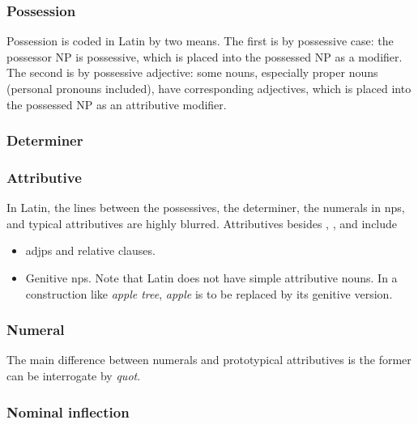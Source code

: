 \documentclass{article}
\newcommand*{\corpus}[1]{\emph{#1}}
\begin{document}
\subsubsection{Possession}\label{sec:possessive-abs}

Possession is coded in Latin by two means.
The first is by possessive case: 
the possessor NP is possessive, which is placed into the possessed NP as a modifier.
The second is by possessive adjective:
some nouns, especially proper nouns (personal pronouns included), have corresponding adjectives,
which is placed into the possessed NP as an attributive modifier.

\subsubsection{Determiner}\label{sec:determiner-abs}


\subsubsection{Attributive}

In Latin, the lines between the possessives, 
the determiner, the numerals in \ac{np}s, 
and typical attributives 
are highly blurred.
Attributives besides 
, 
, 
and  include 
\begin{itemize}
    \item \ac{adjp}s and relative clauses. %
    \item Genitive \ac{np}s. Note that Latin does not have simple attributive nouns.
    In a construction like \corpus{apple tree}, \corpus{apple} is to be replaced by its genitive version.
\end{itemize}

\subsubsection{Numeral}\label{sec:numeral-np-abs}

The main difference between numerals and prototypical attributives 
is the former can be interrogate by \corpus{quot}.

\subsubsection{Nominal inflection}\label{sec:nominal-inflection-abs}
\end{document}
